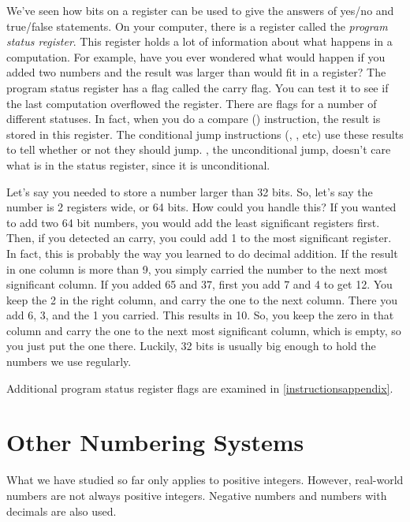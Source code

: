 We've seen how bits on a register can be used to give the answers
of yes/no and true/false statements.  On your computer, there
is a register called the \emph{program status register}.
This register holds a lot of information about what happens in a computation.
For example, have you ever wondered what would happen if you added
two numbers and the result was larger than would fit in a register?
The program status register has a flag called the carry flag.
You can test it to see if the last computation overflowed the register.
There are flags for a number of different statuses.  In fact, when
you do a compare () instruction, the result
is stored in this register.  The conditional jump instructions (,
, etc) use these results to tell whether or not
they should jump.  , the 
unconditional jump, doesn't care what is in the status register, since
it is unconditional.

Let's say you needed to store a number larger than 32 bits.  So, let's
say the number is 2 registers wide, or 64 bits.  How could you handle
this?  If you wanted to add two 64 bit numbers, you would add
the least significant registers first.  Then, if you detected an 
carry, you could add 1 to the most significant register.  
In fact, this is probably the way you learned to
do decimal addition.  If the result in one column is more than 9, you
simply carried the number to the next most significant column.  If you
added 65 and 37, first you add 7 and 4 to get 12.  You keep the 2 in
the right column, and carry the one to the next column.   There you add
6, 3, and the 1 you carried.  This results in 10.  So, you keep the
zero in that column and carry the one to the next most significant column,
which is empty, so you just put the one there.  Luckily, 32 bits is usually
big enough to hold the numbers we use regularly.

Additional program status register flags are examined in \autoref{instructionsappendix}.

\section{Other Numbering Systems}

What we have studied so far only applies to positive integers.  However,
real-world numbers are not always positive integers.  Negative numbers
and numbers with decimals are also used.  

